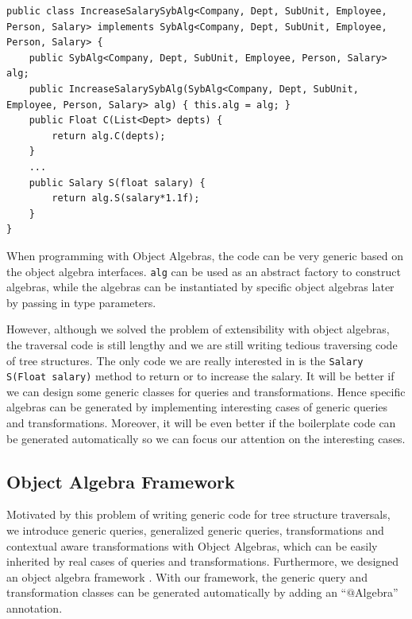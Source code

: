 \begin{lstlisting}[numbers=none]
public class IncreaseSalarySybAlg<Company, Dept, SubUnit, Employee, Person, Salary> implements SybAlg<Company, Dept, SubUnit, Employee, Person, Salary> {
	public SybAlg<Company, Dept, SubUnit, Employee, Person, Salary> alg;
	public IncreaseSalarySybAlg(SybAlg<Company, Dept, SubUnit, Employee, Person, Salary> alg) { this.alg = alg; }
	public Float C(List<Dept> depts) {
		return alg.C(depts);
	}
	...
	public Salary S(float salary) {
		return alg.S(salary*1.1f);
	}
}
\end{lstlisting}

  
When programming with Object Algebras, the code can be very generic based on the object algebra interfaces. \lstinline{alg} can be used as an abstract factory to construct algebras, while the algebras can be instantiated by specific object algebras later by passing in type parameters. 

However, although we solved the problem of extensibility with object algebras, the traversal code is still lengthy and we are still writing tedious traversing code of tree structures. The only code we are really interested in is the \lstinline{Salary S(Float salary)} method to return or to increase the salary. It will be better if we can design some generic classes for queries and transformations. Hence specific algebras can be generated by
implementing interesting cases of generic queries and
transformations. Moreover, it will be even better if the boilerplate code can be generated automatically so we can focus our attention on the interesting cases.

\subsection{Object Algebra Framework}
Motivated by this problem of writing generic code for tree structure
traversals, we introduce generic queries, generalized generic queries, transformations and contextual aware transformations with Object Algebras, which can be easily inherited by real cases of queries and transformations. Furthermore, we designed an object algebra framework \name. With our framework, the generic query and transformation classes can be generated automatically by adding an ``$@$Algebra'' annotation.

